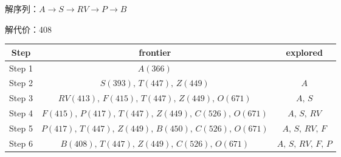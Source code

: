 \begin{example}
\begin{enumerate}
        \textcolor{main1}{解序列：}$A\to S\to RV\to P\to B$

        \textcolor{main1}{解代价：}408
        \begin{table}[htbp]
            \centering
            \begin{tabular}{ccc}
            \toprule[1.5pt]
            Step & frontier & explored \\
            \midrule[1pt]
            Step 1 & $A(366)$ &  \\
            Step 2 & $S(393),\,T(447),\,Z(449)$ & $A$ \\
            Step 3 & $RV(413),\,F(415),\,T(447),\,Z(449),\,O(671)$ & $A,\,S$ \\
            Step 4 & $F(415),\,P(417),\,T(447),\,Z(449),\,C(526),\,O(671)$ & $A,\,S,\,RV$ \\
            Step 5 & $P(417),\,T(447),\,Z(449),\,B(450),\,C(526),\,O(671)$ & $A,\,S,\,RV,\,F$ \\
            Step 6 & $B(408),\,T(447),\,Z(449),\,C(526),\,O(671)$ & $A,\,S,\,RV,\,F,\,P$ \\
            \bottomrule[1.5pt]
            \end{tabular}%
        \end{table}%
    \end{enumerate}
\end{example}
